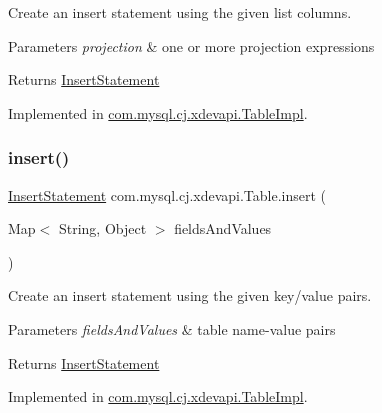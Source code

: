 Create an insert statement using the given list columns.


\begin{DoxyParams}{Parameters}
{\em projection} & one or more projection expressions \\
\hline
\end{DoxyParams}
\begin{DoxyReturn}{Returns}
\mbox{\hyperlink{interfacecom_1_1mysql_1_1cj_1_1xdevapi_1_1_insert_statement}{Insert\+Statement}} 
\end{DoxyReturn}


Implemented in \mbox{\hyperlink{classcom_1_1mysql_1_1cj_1_1xdevapi_1_1_table_impl_a6ead605c582f7e5d5e95c0704a17686a}{com.\+mysql.\+cj.\+xdevapi.\+Table\+Impl}}.

\mbox{\label{interfacecom_1_1mysql_1_1cj_1_1xdevapi_1_1_table_a2a66f6dde400c00f896c02673e7fdc84}} 
\subsubsection{\texorpdfstring{insert()}{insert()}\hspace{0.1cm}{\footnotesize\ttfamily [3/3]}}
{\footnotesize\ttfamily \mbox{\hyperlink{interfacecom_1_1mysql_1_1cj_1_1xdevapi_1_1_insert_statement}{Insert\+Statement}} com.\+mysql.\+cj.\+xdevapi.\+Table.\+insert (\begin{DoxyParamCaption}\item[{Map$<$ String, Object $>$}]{fields\+And\+Values }\end{DoxyParamCaption})}

Create an insert statement using the given key/value pairs.


\begin{DoxyParams}{Parameters}
{\em fields\+And\+Values} & table name-\/value pairs \\
\hline
\end{DoxyParams}
\begin{DoxyReturn}{Returns}
\mbox{\hyperlink{interfacecom_1_1mysql_1_1cj_1_1xdevapi_1_1_insert_statement}{Insert\+Statement}} 
\end{DoxyReturn}


Implemented in \mbox{\hyperlink{classcom_1_1mysql_1_1cj_1_1xdevapi_1_1_table_impl_acc6cac6129c86ac4ec2a7ce02303b4bb}{com.\+mysql.\+cj.\+xdevapi.\+Table\+Impl}}.

